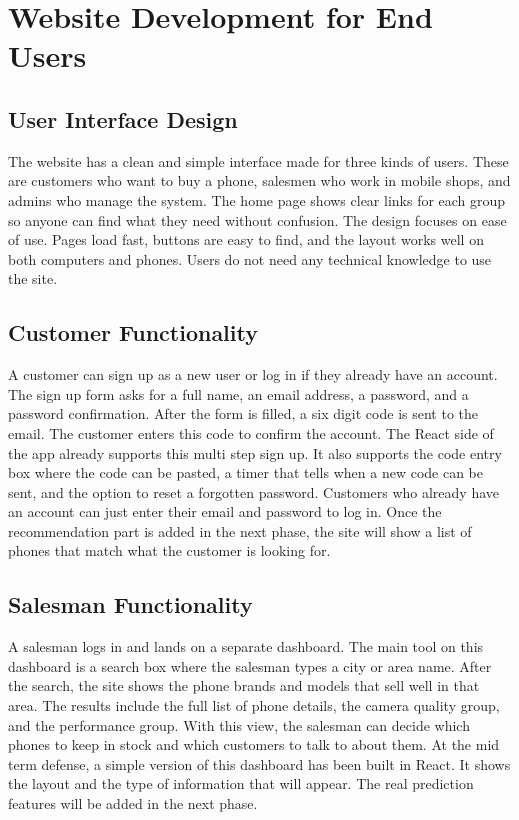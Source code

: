 \documentclass[12pt, a4paper]{report}
\numberwithin{equation}{chapter}
\begin{document}
\section{Website Development for End Users}

\subsection{User Interface Design}

The website has a clean and simple interface made for three kinds of users. These are customers who want to buy a phone, salesmen who work in mobile shops, and admins who manage the system. The home page shows clear links for each group so anyone can find what they need without confusion. The design focuses on ease of use. Pages load fast, buttons are easy to find, and the layout works well on both computers and phones. Users do not need any technical knowledge to use the site.

\subsection{Customer Functionality}

A customer can sign up as a new user or log in if they already have an account. The sign up form asks for a full name, an email address, a password, and a password confirmation. After the form is filled, a six digit code is sent to the email. The customer enters this code to confirm the account. The React side of the app already supports this multi step sign up. It also supports the code entry box where the code can be pasted, a timer that tells when a new code can be sent, and the option to reset a forgotten password. Customers who already have an account can just enter their email and password to log in. Once the recommendation part is added in the next phase, the site will show a list of phones that match what the customer is looking for.

\subsection{Salesman Functionality}

A salesman logs in and lands on a separate dashboard. The main tool on this dashboard is a search box where the salesman types a city or area name. After the search, the site shows the phone brands and models that sell well in that area. The results include the full list of phone details, the camera quality group, and the performance group. With this view, the salesman can decide which phones to keep in stock and which customers to talk to about them. At the mid term defense, a simple version of this dashboard has been built in React. It shows the layout and the type of information that will appear. The real prediction features will be added in the next phase.
\end{document}
